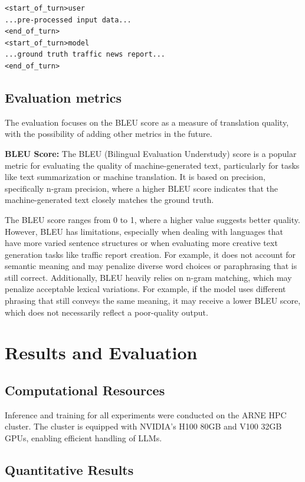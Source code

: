\documentclass[fleqn,moreauthors,10pt]{ds_report}
\begin{document}
\begin{verbatim}
<start_of_turn>user
...pre-processed input data...
<end_of_turn>
<start_of_turn>model
...ground truth traffic news report...
<end_of_turn>
\end{verbatim}

\subsection*{Evaluation metrics}

The evaluation focuses on the BLEU score as a measure of translation quality, with the possibility of adding other metrics in the future.

\noindent \textbf{BLEU Score:} The BLEU (Bilingual Evaluation Understudy) score is a popular metric for evaluating the quality of machine-generated text, particularly for tasks like text summarization or machine translation. It is based on precision, specifically n-gram precision, where a higher BLEU score indicates that the machine-generated text closely matches the ground truth.

The BLEU score ranges from 0 to 1, where a higher value suggests better quality. However, BLEU has limitations, especially when dealing with languages that have more varied sentence structures or when evaluating more creative text generation tasks like traffic report creation. For example, it does not account for semantic meaning and may penalize diverse word choices or paraphrasing that is still correct. Additionally, BLEU heavily relies on n-gram matching, which may penalize acceptable lexical variations. For example, if the model uses different phrasing that still conveys the same meaning, it may receive a lower BLEU score, which does not necessarily reflect a poor-quality output.


\section{Results and Evaluation}

\subsection*{Computational Resources}

Inference and training for all experiments were conducted on the ARNE HPC cluster. The cluster is equipped with NVIDIA's H100 80GB and V100 32GB GPUs, enabling efficient handling of LLMs.

\subsection*{Quantitative Results}
\end{document}

